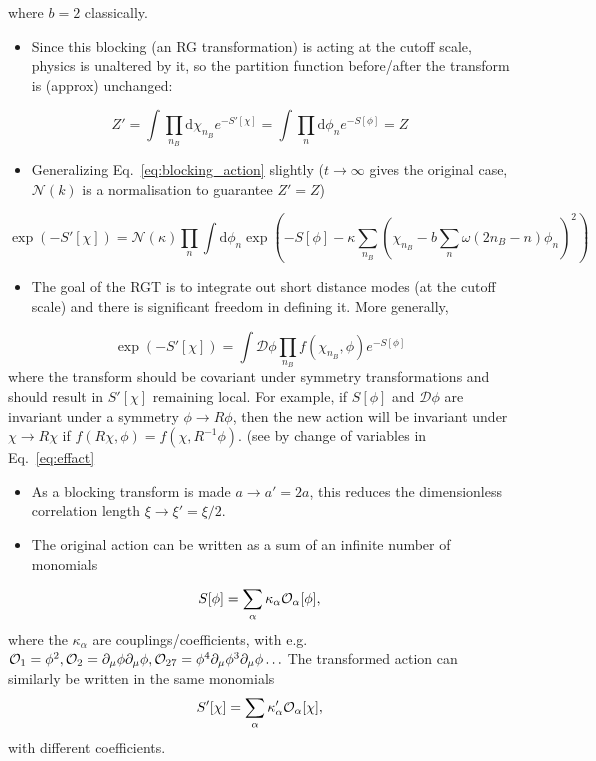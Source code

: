 where $b=2$ classically.
%
\begin{itemize}
    \item Since this blocking (an RG transformation) is acting at the cutoff scale, physics is unaltered by it, so the partition function before/after the transform is (approx) unchanged:
\end{itemize}
\begin{equation}
    Z' = \int \prod_{n_B}\text{d}\chi_{n_B}e^{-S'[\chi]} = \int \prod_n \text{d}\phi_ne^{-S[\phi]} = Z
\end{equation}
\begin{itemize}
    \item Generalizing Eq.~\eqref{eq:blocking_action} slightly ($t \to \infty$ gives the original case, $\mathcal{N}(k)$ is a normalisation to guarantee $Z' = Z$)
\end{itemize}
\begin{equation}
    \exp(-S'[\chi]) = \mathcal{N}(\kappa) \prod_n \int \text{d}\phi_n \exp\left(-S[\phi] - \kappa \sum_{n_B}\left(\chi_{n_B} - b \sum_n \omega(2 n_B - n) \phi_n\right)^2\right)
\end{equation}
\begin{itemize}
    \item The goal of the RGT is to integrate out short distance modes (at the cutoff scale) and there is significant freedom in defining it. More generally,
\end{itemize}
\begin{equation}
    \exp(-S'[\chi]) = \int \mathcal{D}\phi \prod_{n_B}f(\chi_{n_B}, \phi) e^{-S[\phi]}
    \label{eq:effact}
\end{equation}
where the transform should be covariant under symmetry transformations and should result in $S'[\chi]$ remaining local. For example, if $S[\phi]$ and $\mathcal{D}\phi$ are invariant under a symmetry $\phi \to R \phi$, then the new action will be invariant under $\chi \to R \chi$ if $f(R\chi, \phi) = f(\chi, R^{-1}\phi).$ (see by change of variables in Eq.~\eqref{eq:effact}
\begin{itemize}
    \item As a blocking transform is made $a \to a'=2a$, this reduces the dimensionless correlation length $\xi \to \xi' = \xi/2$.
    \item The original action can be written as a sum of an infinite number of monomials
\end{itemize}
\begin{equation}
    S[\phi] = \sum_\alpha \kappa_\alpha \mathcal{O}_\alpha[\phi],
\end{equation}
where the $\kappa_\alpha$ are couplings/coefficients, with e.g. $\mathcal{O}_1 = \phi^2, \mathcal{O}_2 = \partial_\mu \phi \partial_\mu \phi, \mathcal{O}_{27} = \phi^4 \partial_\mu \phi^3 \partial_\mu \phi \ldots$ The transformed action can similarly be written in the same monomials
\begin{equation}
    S'[\chi] = \sum_\alpha \kappa_\alpha' \mathcal{O}_\alpha[\chi],
\end{equation}
with different coefficients.

